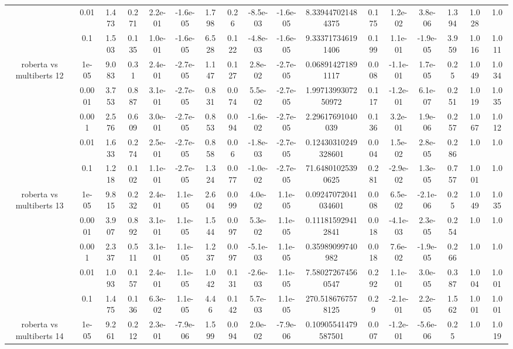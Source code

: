 \begin{tabular}{|c|c|c|c|c|c|c|c|c|c|c|c|c|c|c|c|c|}
 & 0.01 & 1.473 & 0.271 & 2.2e-01 & -1.6e-05 & 1.798 & 0.26 & -8.5e-03 & -1.6e-05 & 8.339447021484375 & 0.175 & 1.2e-02 & 3.8e-06 & 1.394 & 1.028 & 1.0 \\
 & 0.1 & 1.503 & 0.135 & 1.0e-01 & -1.6e-05 & 6.528 & 0.122 & -4.8e-03 & -1.6e-05 & 9.333717346191406 & 0.199 & 1.1e-01 & -1.9e-05 & 3.959 & 1.016 & 1.011 \\
\hline
\multirow{5}{*}{roberta  vs multiberts 12} & 1e-05 & 9.083 & 0.31 & 2.4e-01 & -2.7e-05 & 1.147 & 0.127 & 2.8e-02 & -2.7e-05 & 0.068914271891117 & 0.008 & -1.1e-01 & 1.7e-05 & 0.25 & 1.049 & 1.034 \\
 & 0.0001 & 3.753 & 0.887 & 3.1e-01 & -2.7e-05 & 0.831 & 0.074 & 5.5e-02 & -2.7e-05 & 1.9971399307250972 & 0.117 & -1.2e-01 & 6.1e-07 & 0.251 & 1.019 & 1.035 \\
 & 0.001 & 2.576 & 0.609 & 3.0e-01 & -2.7e-05 & 0.853 & 0.094 & -1.6e-02 & -2.7e-05 & 2.29617691040039 & 0.136 & 3.2e-01 & 1.9e-06 & 0.257 & 1.067 & 1.012 \\
 & 0.01 & 1.633 & 0.274 & 2.5e-01 & -2.7e-05 & 0.858 & 0.06 & -1.8e-03 & -2.7e-05 & 0.12430310249328601 & 0.004 & 1.5e-02 & 2.8e-05 & 0.286 & 1.0 & 1.0 \\
 & 0.1 & 1.218 & 0.102 & 1.1e-01 & -2.7e-05 & 1.324 & 0.077 & -1.0e-02 & -2.7e-05 & 71.64801025390625 & 0.281 & -2.9e-02 & 1.3e-05 & 0.757 & 1.001 & 1.0 \\
\hline
\multirow{5}{*}{roberta  vs multiberts 13} & 1e-05 & 9.815 & 0.232 & 2.4e-01 & 1.1e-05 & 2.604 & 0.099 & 4.0e-02 & 1.1e-05 & 0.09247072041034601 & 0.008 & 6.5e-02 & -2.1e-06 & 0.25 & 1.049 & 1.035 \\
 & 0.0001 & 3.907 & 0.892 & 3.1e-01 & 1.1e-05 & 1.544 & 0.097 & 5.3e-02 & 1.1e-05 & 0.111815929412841 & 0.018 & -4.1e-03 & 2.3e-05 & 0.254 & 1.0 & 1.0 \\
 & 0.001 & 2.337 & 0.511 & 3.1e-01 & 1.1e-05 & 1.237 & 0.097 & -5.1e-03 & 1.1e-05 & 0.35989099740982 & 0.018 & 7.6e-02 & -1.9e-05 & 0.266 & 1.0 & 1.0 \\
 & 0.01 & 1.093 & 0.157 & 2.4e-01 & 1.1e-05 & 1.042 & 0.131 & -2.6e-03 & 1.1e-05 & 7.580272674560547 & 0.292 & 1.1e-01 & 3.0e-05 & 0.387 & 1.004 & 1.001 \\
 & 0.1 & 1.475 & 0.136 & 6.3e-02 & 1.1e-05 & 4.46 & 0.142 & 5.7e-03 & 1.1e-05 & 270.5186767578125 & 0.29 & -2.1e-01 & 2.2e-05 & 1.562 & 1.001 & 1.001 \\
\hline
\multirow{5}{*}{roberta  vs multiberts 14} & 1e-05 & 9.261 & 0.212 & 2.3e-01 & -7.9e-06 & 1.599 & 0.094 & 2.0e-02 & -7.9e-06 & 0.10905541479587501 & 0.007 & -1.2e-01 & -5.6e-06 & 0.25 & 1.0 & 1.019 \\

\end{tabular}
